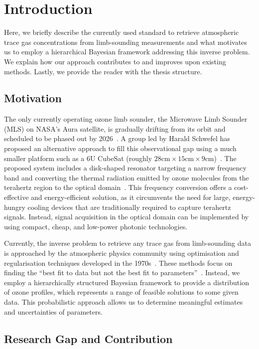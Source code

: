 \chapter{Introduction}
Here, we briefly describe the currently used standard to retrieve atmospheric trace gas concentrations from limb-sounding measurements and what motivates us to employ a hierarchical Bayesian framework addressing this inverse problem.
We explain how our approach contributes to and improves upon existing methods.
Lastly, we provide the reader with the thesis structure.


\section{Motivation}
The only currently operating ozone limb sounder, the Microwave Limb Sounder (MLS) on NASA's Aura satellite, is gradually drifting from its orbit and scheduled to be phased out by 2026~\cite{Bryan2024NASA}.
A group led by Harald Schwefel has proposed an alternative approach to fill this observational gap using a much smaller platform such as a 6U CubeSat (roughly $28\text{cm} \times 15\text{cm} \times 9\text{cm}$)~\cite{ustin2024current}. 
The proposed system includes a disk-shaped resonator targeting a narrow frequency band and converting the thermal radiation emitted by ozone molecules from the terahertz region to the optical domain~\cite{Suresh25,Sedlmeir14}. 
This frequency conversion offers a cost-effective and energy-efficient solution, as it circumvents the need for large, energy-hungry cooling devices that are traditionally required to capture terahertz signals. 
Instead, signal acquisition in the optical domain can be implemented by using compact, cheap, and low-power photonic technologies.

Currently, the inverse problem to retrieve any trace gas from limb-sounding data is approached by the atmospheric physics community using optimisation and regularisation techniques developed in the 1970s~\cite{rodgers1976retrieval, NASA2022MLSv5}.
These methods focus on finding the ``best fit to data but not the best fit to parameters''~\cite{tan2016LecNot}.
Instead, we employ a hierarchically structured Bayesian framework to provide a distribution of ozone profiles, which represents a range of feasible solutions to some given data.
This probabilistic approach allows us to determine meaningful estimates and uncertainties of parameters.

\section{Research Gap and Contribution}

